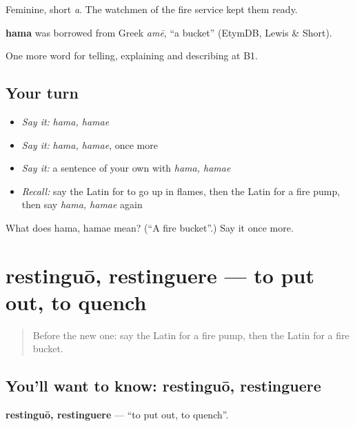 Feminine, short \emph{a}. The watchmen of the fire service kept them ready.

\begin{cousinweb}
\textbf{hama} was borrowed from Greek \emph{amē}, \textquotedblleft{}a bucket\textquotedblright{} (EtymDB, Lewis \& Short).
\end{cousinweb}

\begin{grammarlens}[title={What you've built}]
One more word for telling, explaining and describing at B1.
\end{grammarlens}

\subsection*{Your turn}
\begin{itemize}
\raggedright
  \item \emph{Say it:} \emph{hama, hamae}
  \item \emph{Say it:} \emph{hama, hamae}, once more
  \item \emph{Say it:} a sentence of your own with \emph{hama, hamae}
  \item \emph{Recall:} say the Latin for to go up in flames, then the Latin for a fire pump, then say \emph{hama, hamae} again
\end{itemize}

\begin{tcolorbox}[breakable,colback=teal!4,colframe=teal!35!black,title={Before you move on}]
What does hama, hamae mean? (\textquotedblleft{}A fire bucket\textquotedblright{}.) Say it once more.
\end{tcolorbox}
\section[restinguō, restinguere]{restinguō, restinguere — to put out, to quench}

\label{lesson:LA-C319-restinguo}



\begin{quote}
Before the new one: say the Latin for a fire pump, then the Latin for a fire bucket.
\end{quote}

\subsection*{You'll want to know: restinguō, restinguere}
\textbf{restinguō, restinguere} — \textquotedblleft{}to put out, to quench\textquotedblright{}.

